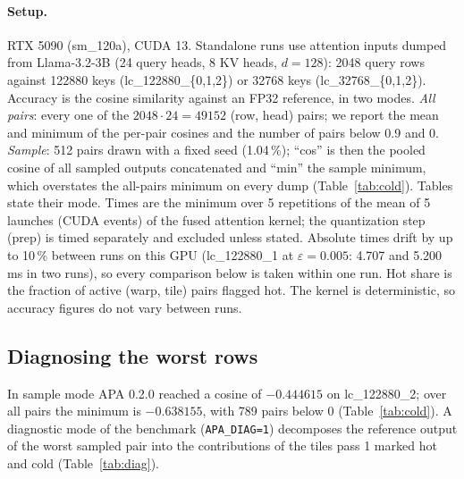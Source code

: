 \documentclass[10pt,twocolumn]{article}
\newcommand{\eps}{\varepsilon}
\newcommand{\code}[1]{\texttt{#1}}
\begin{document}
\paragraph{Setup.} RTX 5090 (sm\_120a), CUDA 13. Standalone runs use attention inputs dumped from
Llama-3.2-3B \cite{grattafiori2024llama3} (24 query heads, 8 KV heads, $d=128$): 2048 query rows against
122880 keys (lc\_122880\_\{0,1,2\}) or 32768 keys (lc\_32768\_\{0,1,2\}). Accuracy is the cosine similarity
against an FP32 reference, in two modes. \emph{All pairs}: every one of the $2048\cdot24=49152$ (row, head)
pairs; we report the mean and minimum of the per-pair cosines and the number of pairs below 0.9 and 0.
\emph{Sample}: 512 pairs drawn with a fixed seed (1.04\,\%); ``cos'' is then the pooled cosine of all
sampled outputs concatenated and ``min'' the sample minimum, which overstates the all-pairs minimum on every
dump (Table~\ref{tab:cold}). Tables state their mode. Times are the minimum over 5 repetitions of the mean
of 5 launches (CUDA events) of the fused attention kernel; the quantization step (prep) is timed separately
and excluded unless stated. Absolute times drift by up to 10\,\%
between runs on this GPU (lc\_122880\_1 at $\eps=0.005$: 4.707 and 5.200\,ms in two runs), so every
comparison below is taken within one run. Hot share is the fraction of active (warp, tile) pairs flagged
hot. The kernel is deterministic, so accuracy figures do not vary between runs.

\subsection{Diagnosing the worst rows}
\label{sec:diag}

In sample mode APA 0.2.0 reached a cosine of $-0.444615$ on lc\_122880\_2; over all pairs the minimum is
$-0.638155$, with 789 pairs below 0 (Table~\ref{tab:cold}). A diagnostic mode of the benchmark
(\code{APA\_DIAG=1}) decomposes the reference output of the worst sampled pair into the contributions of the
tiles pass 1 marked hot and cold (Table~\ref{tab:diag}).
\end{document}
